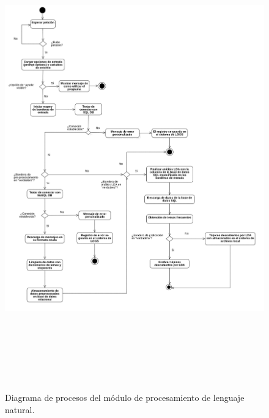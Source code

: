         \begin{figure}[H]
             \centering
             \includegraphics[height=20cm, width=16.5cm]{Latex/Classes/Imagenes/NLP.png}
             \caption{Diagrama de procesos del módulo de procesamiento de lenguaje natural.}
             \label{fig:dp-nlp}
        \end{figure}

